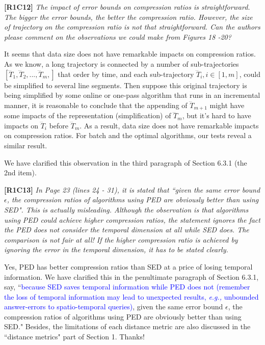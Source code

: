 \documentclass{letter}
\newcommand{\eg}{\emph{e.g.,}\xspace}
\begin{document}
{\textbf{[R1C12]} \emph{The impact of error bounds on compression ratios is straightforward. The bigger the error bounds, the better the compression ratio. However, the size of trajectory on the compression ratio is not that straightforward. Can the authors please comment on the observations we could make from Figures 18 -20? }

It seems that data size does not have remarkable impacts on compression ratios. As we know, a long trajectory is connected by a number of sub-trajectories $[\dddot{T}_1,\dddot{T}_2,..., \dddot{T}_m, ]$ that order by time, and each sub-trajectory $\dddot{T}_i, i \in [1,m]$, could be simplified to several line segments. Then suppose this original trajectory is being simplified by some online or one-pass algorithm that runs in an incremental manner, it is reasonable to conclude that the appending of $\dddot{T}_{m+1}$ might have some impacts of the representation (simplification) of $\dddot{T}_{m}$, but it's hard to have impacts on $\dddot{T}_i$ before $\dddot{T}_{m}$. As a result, data size does not have remarkable impacts on compression ratios. For batch and the optimal algorithms, our tests reveal a similar result.

We have clarified this observation in the third paragraph of Section 6.3.1 (the 2{nd} item). 



\textbf{[R1C13]} \emph{ In Page 23 (lines 24 - 31), it is stated that ``given the same error bound $\epsilon$, the compression ratios of algorithms using PED are obviously better than using SED". This is actually misleading. Although the observation is that algorithms using PED could achieve higher compression ratios, the statement ignores the fact the PED does not consider the temporal dimension at all while SED does. The comparison is not fair at all! If the higher compression ratio is achieved by ignoring the error in the temporal dimension, it has to be stated clearly.} 

Yes, PED has better compression ratios than SED at a price of losing temporal information. We have clarified this in the penultimate paragraph of Section 6.3.1, say, ``\textcolor{blue}{because SED saves temporal information while PED does not (remember the loss of temporal information may lead to unexpected results, \eg unbounded answer-errors to spatio-temporal queries)}, given the same error bound $\epsilon$, the compression ratios of algorithms using PED are obviously better than using SED." 
Besides, the limitations of each distance metric are also discussed in the ``distance metrics" part of Section 1. Thanks!

}
\end{document}
